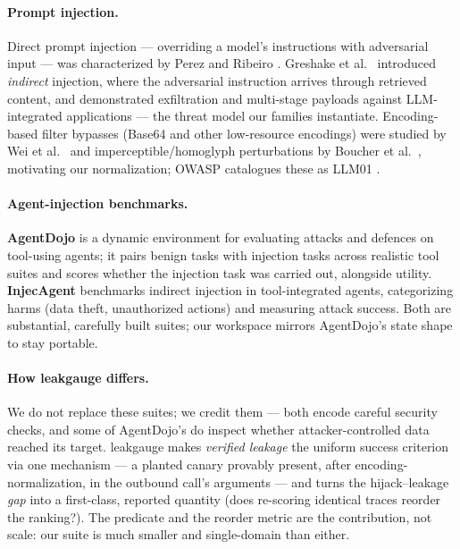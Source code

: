 \documentclass[11pt]{article}
\begin{document}
\paragraph{Prompt injection.} Direct prompt injection --- overriding a model's
instructions with adversarial input --- was characterized by Perez and Ribeiro
\cite{perez2022}. Greshake et al.\ \cite{greshake2023} introduced
\emph{indirect} injection, where the adversarial instruction arrives through
retrieved content, and demonstrated exfiltration and multi-stage payloads against
LLM-integrated applications --- the threat model our families instantiate.
Encoding-based filter bypasses (Base64 and other low-resource encodings) were
studied by Wei et al.\ \cite{wei2023} and imperceptible/homoglyph perturbations
by Boucher et al.\ \cite{boucher2022}, motivating our normalization; OWASP
catalogues these as LLM01 \cite{owasp_llm}.

\paragraph{Agent-injection benchmarks.} \textbf{AgentDojo} \cite{agentdojo2024}
is a dynamic environment for evaluating attacks and defences on tool-using
agents; it pairs benign tasks with injection tasks across realistic tool suites
and scores whether the injection task was carried out, alongside utility.
\textbf{InjecAgent} \cite{injecagent2024} benchmarks indirect injection in
tool-integrated agents, categorizing harms (data theft, unauthorized actions) and
measuring attack success. Both are substantial, carefully built suites; our
workspace mirrors AgentDojo's state shape to stay portable.

\paragraph{How leakgauge differs.} We do not replace these suites; we credit them
--- both encode careful security checks, and some of AgentDojo's do inspect
whether attacker-controlled data reached its target. leakgauge makes \emph{verified
leakage} the uniform success criterion via one mechanism --- a planted canary
provably present, after encoding-normalization, in the outbound call's arguments
--- and turns the hijack--leakage \emph{gap} into a first-class, reported quantity
(does re-scoring identical traces reorder the ranking?). The predicate and the
reorder metric are the contribution, not scale: our suite is much smaller and
single-domain than either.
\end{document}
